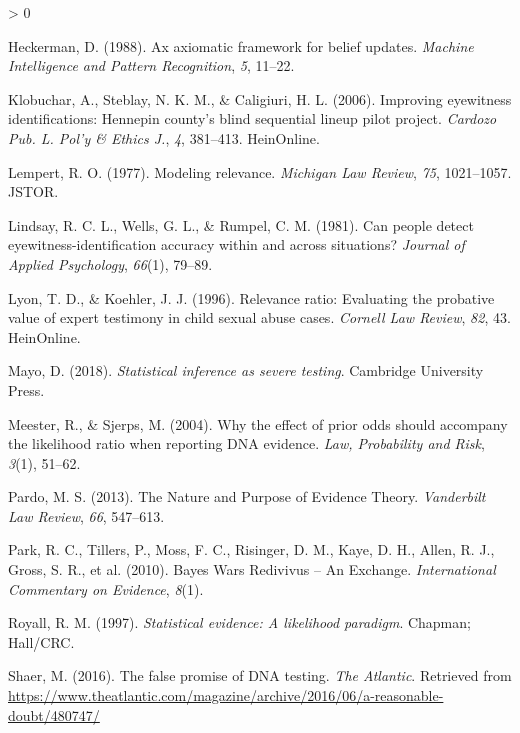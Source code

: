 \documentclass[
  10pt,
  dvipsnames,enabledeprecatedfontcommands]{scrartcl}
\newlength{\cslhangindent}
\newenvironment{CSLReferences}[2] %
 {%
  \setlength{\parindent}{0pt}
  \ifodd #1 \everypar{\setlength{\hangindent}{\cslhangindent}}\ignorespaces\fi
  \ifnum #2 > 0
  \setlength{\parskip}{#2\baselineskip}
  \fi
 }%
 {}
\begin{document}
\begin{CSLReferences}{1}{0}
\leavevmode\hypertarget{ref-Heckerman1988axiomatic}{}%
Heckerman, D. (1988). Ax axiomatic framework for belief updates.
\emph{Machine Intelligence and Pattern Recognition}, \emph{5}, 11--22.

\leavevmode\hypertarget{ref-klobuchar2006improving}{}%
Klobuchar, A., Steblay, N. K. M., \& Caligiuri, H. L. (2006). Improving
eyewitness identifications: Hennepin county's blind sequential lineup
pilot project. \emph{Cardozo Pub. L. Pol'y \& Ethics J.}, \emph{4},
381--413. HeinOnline.

\leavevmode\hypertarget{ref-lempert1977modeling}{}%
Lempert, R. O. (1977). Modeling relevance. \emph{Michigan Law Review},
\emph{75}, 1021--1057. JSTOR.

\leavevmode\hypertarget{ref-Lindsay1981CanPeopleDetect}{}%
Lindsay, R. C. L., Wells, G. L., \& Rumpel, C. M. (1981). Can people
detect eyewitness-identification accuracy within and across situations?
\emph{Journal of Applied Psychology}, \emph{66}(1), 79--89.

\leavevmode\hypertarget{ref-lyon1996relevance}{}%
Lyon, T. D., \& Koehler, J. J. (1996). Relevance ratio: Evaluating the
probative value of expert testimony in child sexual abuse cases.
\emph{Cornell Law Review}, \emph{82}, 43. HeinOnline.

\leavevmode\hypertarget{ref-mayo2018}{}%
Mayo, D. (2018). \emph{Statistical inference as severe testing}.
Cambridge University Press.

\leavevmode\hypertarget{ref-meester2004WhyEffectPriora}{}%
Meester, R., \& Sjerps, M. (2004). Why the effect of prior odds should
accompany the likelihood ratio when reporting {DNA} evidence. \emph{Law,
Probability and Risk}, \emph{3}(1), 51--62.

\leavevmode\hypertarget{ref-pardo2013NaturePurposeEvidence}{}%
Pardo, M. S. (2013). The {Nature} and {Purpose} of {Evidence Theory}.
\emph{Vanderbilt Law Review}, \emph{66}, 547--613.

\leavevmode\hypertarget{ref-park2010BayesWarsRedivivus}{}%
Park, R. C., Tillers, P., Moss, F. C., Risinger, D. M., Kaye, D. H.,
Allen, R. J., Gross, S. R., et al. (2010). Bayes {Wars Redivivus} -- {An
Exchange}. \emph{International Commentary on Evidence}, \emph{8}(1).

\leavevmode\hypertarget{ref-Royall1997}{}%
Royall, R. M. (1997). \emph{Statistical evidence: A likelihood
paradigm}. Chapman; Hall/CRC.

\leavevmode\hypertarget{ref-Shaer2016False}{}%
Shaer, M. (2016). The false promise of DNA testing. \emph{The Atlantic}.
Retrieved from
\url{https://www.theatlantic.com/magazine/archive/2016/06/a-reasonable-doubt/480747/}


\end{CSLReferences}
\end{document}
